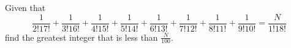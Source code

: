Given that \[ \frac 1{2!17!}+\frac 1{3!16!}+\frac 1{4!15!}+\frac 1{5!14!}+\frac 1{6!13!}+\frac 1{7!12!}+\frac 1{8!11!}+\frac 1{9!10!}=\frac N{1!18!} \] find the greatest integer that is less than $\frac N{100}.$